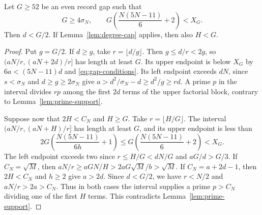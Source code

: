 \begin{lemma}
\label{lem:gap-caps}
Let \(G\ge52\) be an even record gap such that
\begin{equation}
 G\ge 4\sigma_N,\qquad
 G\left(\frac{N(5N-11)}6+2\right)<X_G .
 \label{eq:gap-conditions}
\end{equation}
Then \(d<G/2\). If Lemma~\ref{lem:degree-cap} applies, then also
\(H<G\).
\end{lemma}
\begin{proof}
Put \(g=G/2\). If \(d\ge g\), take \(r=\lfloor d/g\rfloor\).
Then \(g\le d/r<2g\), so \((aN/r,(aN+2d)/r]\) has length
at least \(G\). Its upper endpoint is below \(X_G\) by
\(6a<(5N-11)d\) and \eqref{eq:gap-conditions}. Its left endpoint
exceeds \(dN\), since \(s<\sigma_N\) and \(d\ge g\ge2\sigma_N\)
give \(a>d^2/\sigma_N-d\ge d^2/g\ge rd\).
A prime \(p\) in the interval divides \(rp\) among the first
\(2d\) terms of the upper factorial block, contrary to
Lemma~\ref{lem:prime-support}.

Suppose now that \(2H<C_N\) and \(H\ge G\).
Take \(r=\lfloor H/G\rfloor\). The interval
\((aN/r,(aN+H)/r]\) has length at least \(G\), and its upper
endpoint is less than
\[
 2G\left(\frac{N(5N-11)}{6h}+1\right)
 \le G\left(\frac{N(5N-11)}6+2\right)<X_G .
\]
The left endpoint exceeds two since \(r\le H/G<dN/G\) and
\(aG/d>G/3\).
If \(C_N=\sqrt M\), then \(aN/r\ge aGN/H>2aG\sqrt M/b>\sqrt M\).
If \(C_N=a+2d-1\), then \(2H<C_N\) and \(h\ge2\) give \(a>2d\).
Since \(d<G/2\), we have \(r<N/2\) and \(aN/r>2a>C_N\).
Thus in both cases the interval supplies a prime \(p>C_N\)
dividing one of the first \(H\) terms. This contradicts
Lemma~\ref{lem:prime-support}.
\end{proof}

